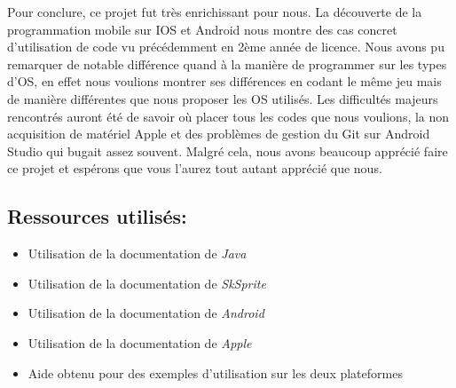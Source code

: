 \documentclass{article}
\begin{document}
Pour conclure, ce projet fut très enrichissant pour nous. La découverte de la programmation mobile sur IOS et Android nous montre des cas concret d'utilisation de code vu précédemment en 2ème année de licence. Nous avons pu remarquer de notable différence quand à la manière de programmer sur les types d'OS, en effet nous voulions montrer ses différences en codant le même jeu mais de manière différentes que nous proposer les OS utilisés. 
Les difficultés majeurs rencontrés auront été de savoir où placer tous les codes que nous voulions, la non acquisition de matériel Apple et des problèmes de gestion du Git sur Android Studio qui bugait assez souvent. 
Malgré cela, nous avons beaucoup apprécié faire ce projet et espérons que vous l'aurez tout autant apprécié que nous.

\subsection{Ressources utilisés:}
\begin{itemize}
\item Utilisation de la documentation de \textit{Java}~\cite{Javageek}
\item Utilisation de la documentation de \textit{SkSprite}~\cite{raywenderlich}
\item Utilisation de la documentation de \textit{Android}~\cite{developer}
\item Utilisation de la documentation de \textit{Apple}~\cite{AppDoc}
\item Aide obtenu pour des exemples d'utilisation sur les deux plateformes \cite{stackOverflow}

\end{itemize}


\	
\end{document}
